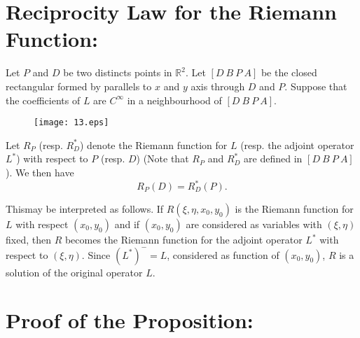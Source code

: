 \section*{Reciprocity Law for the Riemann Function:}

\begin{prop*}
Let $P$ and $D$ be two distincts points in $\mathbb{R}^{2}$. Let $[D \ B \ P \ A]$ be the closed rectangular formed by parallels to $x$ and $y$ axis through $D$ and $P$. Suppose that the coefficients of $L$ are $C^{\infty}$ in a neighbourhood of $[D \ B \ P \ A]$.
\begin{figure}[H]
\centering
\texttt{[image: 13.eps]}
\end{figure}
\end{prop*}

Let $R_{P}$ (resp. $R^{*}_{D}$) denote the Riemann function for $L$ (resp. the adjoint operator $L^{*}$) with respect to $P$ (resp. $D$) (Note that $R_{P}$ and $R^{*}_{D}$ are defined in $[D \ B \ P \ A]$). We then have
$$
R_{P}(D)=R^{*}_{D}(P).
$$

\begin{remark*}
This\pageoriginale may be interpreted as follows. If $R(\xi, \eta, x_{0}, y_{0})$ is the Riemann function for $L$ with respect $(x_{0},y_{0})$ and if $(x_{0},y_{0})$ are considered as variables with $(\xi,\eta)$ fixed, then $R$ becomes the Riemann function for the adjoint operator $L^{*}$ with respect to $(\xi,\eta)$. Since $(L^{*})^{-}=L$, considered as function of $(x_{0},y_{0})$, $R$ is a solution of the original operator $L$.
\end{remark*}

\section*{Proof of the Proposition:}

